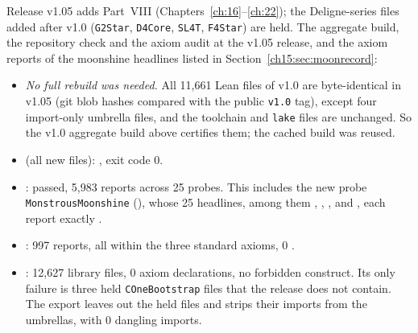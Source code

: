 \begin{status}[title={The release build of v1.05 (Lean v4.30.0)}]
Release v1.05 adds Part~VIII (Chapters~\ref{ch:16}--\ref{ch:22}); the Deligne-series files added after v1.0
(\texttt{G2Star}, \texttt{D4Core}, \texttt{SL4T}, \texttt{F4Star}) are held.
The aggregate build, the repository check and the axiom audit at the v1.05 release, and the axiom reports of
the moonshine headlines listed in Section~\ref{ch15:sec:moonrecord}:
\begin{itemize}
\item \emph{No full rebuild was needed.} All 11{,}661 Lean files of v1.0 are byte-identical in v1.05
  (git blob hashes compared with the public \texttt{v1.0} tag), except four import-only umbrella files, and the
  toolchain and \texttt{lake} files are unchanged. So the v1.0 aggregate build above certifies them; the cached
  build was reused.
\item {} (all new files): , exit code 0.
\item {}: passed, 5{,}983 reports across 25 probes. This includes the new
  probe \texttt{MonstrousMoonshine} (), whose 25
  headlines, among them , , ,
   and , each report exactly
  .
\item {}: 997 reports, all within the three standard axioms, 0
  .
\item {}: 12{,}627 library files, 0 axiom declarations, no forbidden construct. Its
  only failure is three held \texttt{COneBootstrap} files that the release does not contain. The export leaves out the
  held files and strips their imports from the umbrellas, with 0 dangling imports.
\end{itemize}
\end{status}

